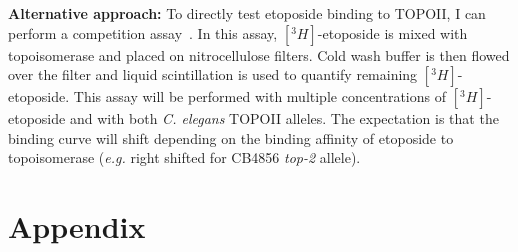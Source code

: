 \documentclass[12pt]{article}
\begin{document}
\vspace{5pt}
{\bf Alternative approach: }To directly test etoposide binding to TOPOII, I can perform a competition assay~\cite{Kingma:1999cc}. In this assay, $[^{3}H]$-etoposide is mixed with topoisomerase and placed on nitrocellulose filters. Cold wash buffer is then flowed over the filter and liquid scintillation is used to quantify remaining $[^{3}H]$-etoposide. This assay will be performed with multiple concentrations of $[^{3}H]$-etoposide and with both {\it C. elegans} TOPOII alleles. The expectation is that the binding curve will shift depending on the binding affinity of etoposide to topoisomerase ({\it e.g.} right shifted for CB4856 {\it top-2} allele). 
\vspace{5pt} 








\newpage



\newpage
\section{Appendix}
\setcounter{figure}{0}  
\end{document}

